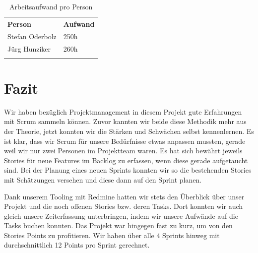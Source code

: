 \begin{longtable}{|l|l|}
\hline 
\textbf{Person} & \textbf{Aufwand} \\ 
\hline 
Stefan Oderbolz & 250h \\ 
\hline 
Jürg Hunziker & 260h \\ 
\hline 
\caption{Arbeitsaufwand pro Person}
\label{projektmanagement-arbeitsaufwand}
\end{longtable} 

\section{Fazit}
Wir haben bezüglich Projektmanagement in diesem Projekt gute Erfahrungen mit Scrum sammeln können. Zuvor kannten wir beide diese Methodik mehr aus der Theorie, jetzt konnten wir die Stärken und Schwächen selbst kennenlernen. Es ist klar, dass wir Scrum für unsere Bedürfnisse etwas anpassen mussten, gerade weil wir nur zwei Personen im Projektteam waren. Es hat sich bewährt jeweils Stories für neue Features im Backlog zu erfassen, wenn diese gerade aufgetaucht sind. Bei der Planung eines neuen Sprints konnten wir so die bestehenden Stories mit Schätzungen versehen und diese dann auf den Sprint planen.

Dank unserem Tooling mit Redmine hatten wir stets den Überblick über unser Projekt und die noch offenen Stories bzw. deren Tasks. Dort konnten wir auch gleich unsere Zeiterfassung unterbringen, indem wir unsere Aufwände auf die Tasks buchen konnten. Das Projekt war hingegen fast zu kurz, um von den Stories Points zu profitieren. Wir haben über alle 4 Sprints hinweg mit durchschnittlich 12 Points pro Sprint gerechnet.